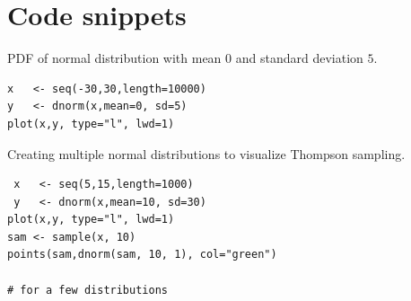 \documentclass[12pt, a4paper, pdflatex, leqno]{report}
\begin{document}
{}
% 


\appendix
\chapter{Code snippets}

\label{snip:normaldist}PDF of normal distribution with mean $0$ and standard deviation $5$.
\begin{lstlisting}
x   <- seq(-30,30,length=10000)
y   <- dnorm(x,mean=0, sd=5)
plot(x,y, type="l", lwd=1)
\end{lstlisting}

\label{snip:thompsonsampling}Creating multiple normal distributions to visualize Thompson sampling.
\begin{lstlisting}
 x   <- seq(5,15,length=1000)
 y   <- dnorm(x,mean=10, sd=30)
plot(x,y, type="l", lwd=1)
sam <- sample(x, 10)
points(sam,dnorm(sam, 10, 1), col="green")

# for a few distributions
\end{lstlisting}
\end{document}
